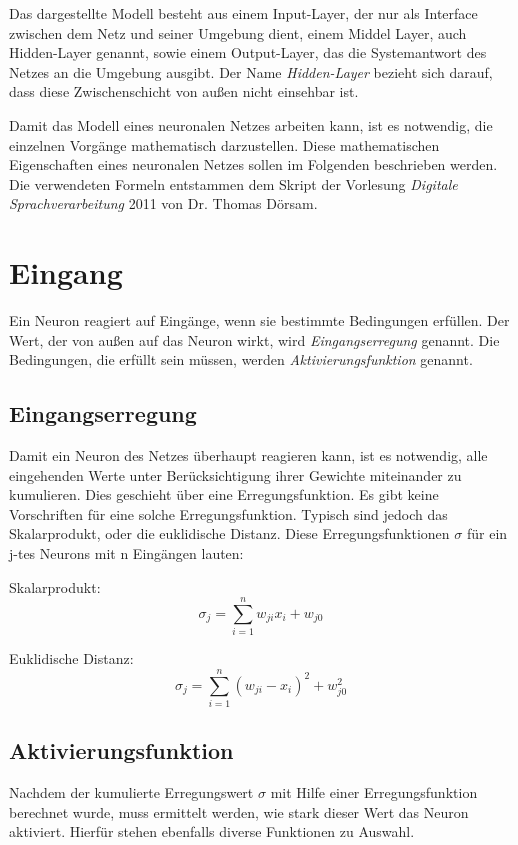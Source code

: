 Das dargestellte Modell besteht aus einem Input-Layer, der nur als Interface zwischen dem Netz und seiner Umgebung dient, einem Middel Layer, auch Hidden-Layer genannt, sowie einem Output-Layer, das die Systemantwort des Netzes an die Umgebung ausgibt. Der Name \emph{Hidden-Layer} bezieht sich darauf, dass diese Zwischenschicht von außen nicht einsehbar ist.

Damit das Modell eines neuronalen Netzes arbeiten kann, ist es notwendig, die einzelnen Vorgänge mathematisch darzustellen. Diese mathematischen Eigenschaften eines neuronalen Netzes sollen im Folgenden beschrieben werden. Die verwendeten Formeln entstammen dem Skript der Vorlesung \emph{Digitale Sprachverarbeitung} 2011 von Dr. Thomas Dörsam.

\section{Eingang}
Ein Neuron reagiert auf Eingänge, wenn sie bestimmte Bedingungen erfüllen. Der Wert, der von außen auf das Neuron wirkt, wird \emph{Eingangserregung} genannt. Die Bedingungen, die erfüllt sein müssen, werden \emph{Aktivierungsfunktion} genannt.

\subsection{Eingangserregung}
Damit ein Neuron des Netzes überhaupt reagieren kann, ist es notwendig, alle eingehenden Werte unter Berücksichtigung ihrer Gewichte miteinander zu kumulieren. Dies geschieht über eine Erregungsfunktion. Es gibt keine Vorschriften für eine solche Erregungsfunktion. Typisch sind jedoch das Skalarprodukt, oder die euklidische Distanz. Diese Erregungsfunktionen $\sigma$ für ein j-tes Neurons mit n Eingängen lauten:

Skalarprodukt:
\begin{equation}
  \sigma_{j} = \sum_{i=1}^{n} w_{ji} x_{i}+w_{j0}
\end{equation} 

Euklidische Distanz:
\begin{equation}
  \sigma_{j} = \sum_{i=1}^{n} (w_{ji} - x_{i})^2+w_{j0}^2
\end{equation} 

\subsection{Aktivierungsfunktion}
Nachdem der kumulierte Erregungswert $\sigma$ mit Hilfe einer Erregungsfunktion berechnet wurde, muss ermittelt werden, wie stark dieser Wert das Neuron aktiviert. Hierfür stehen ebenfalls diverse Funktionen zu Auswahl.


